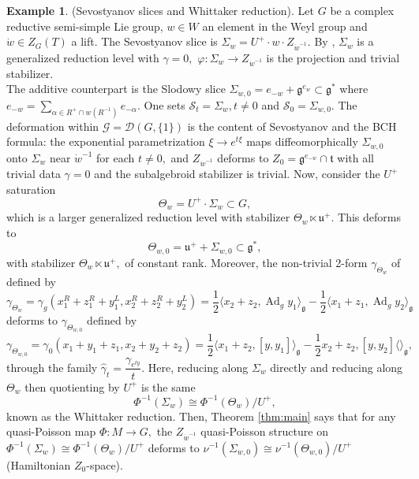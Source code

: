 \documentclass[reqno]{amsart}
\theoremstyle{plain}
\theoremstyle{definition}
\newtheorem{Exp}[Thm]{Example}
\newcommand{\G}{\mathcal{G}}
\newcommand{\g}{\mathfrak{g}}
\newcommand{\too}{\longrightarrow}
\newcommand{\Ad}{\operatorname{Ad}}
\renewcommand{\S}{\mathcal{S}}
\renewcommand{\t}{\mathfrak{t}}
\newcommand{\D}{\mathcal{D}}
\begin{document}
\begin{Exp}(Sevostyanov slices and Whittaker reduction). Let $G$ be a complex reductive semi-simple Lie group, $w\in W$ an element in the Weyl group and $\dot{w} \in Z_{G}(T)$ a lift. The Sevostyanov slice is $\Sigma_{w} = U^{+}\cdot w\cdot Z_{\dot{w}^{-1}}.$ By \cite[]{bualibanu2026reduction}, $\Sigma_w$ is a generalized reduction level with $\gamma = 0,$ $\varphi: \Sigma_w \too Z_{\dot{w}^{-1}}$ is the projection and trivial stabilizer.\\

The additive counterpart is the Slodowy slice $\Sigma_{w,0} = e_{-w} + \g^{e_w} \subset \g^{*}$ where $e_{-w} = \sum_{\alpha \in R^{+}\cap w(R^{-1})} e_{-\alpha}.$ One sets $\S_t = \Sigma_w, t\neq 0$ and $\S_0 = \Sigma_{w,0}.$ The deformation within $\G = \D(G,\{1\})$ is the content of Sevostyanov \cite{sevostyanov2011algebraic} and the BCH formula: the exponential parametrization $\xi \too e^{t\xi}$ maps diffeomorphically $\Sigma_{w,0}$ onto $\Sigma_{w}$ near $\dot{w}^{-1}$ for each $t\neq 0,$ and $Z_{\dot{w}^{-1}}$ deforms to $Z_0 = \g^{e_{-w}} \cap \t$ with all trivial data $\gamma = 0$ and the subalgebroid stabilizer is trivial. Now, consider the $U^{+}$ saturation \[ \Theta_{w} = U^{+}\cdot \Sigma_w \subset G,\] which is a larger generalized reduction level with stabilizer $\Theta_w \ltimes \mathfrak{u}^{+}.$ This deforms to \[
\Theta_{w,0} = \mathfrak{u}^{+} + \Sigma_{w,0} \subset \g^{*},
\]  
with stabilizer $\Theta_w \ltimes \mathfrak{u}^{+},$ of constant rank. Moreover, the non-trivial 2-form $\gamma_{\Theta_w}$ of \cite[Proposition 4.19]{bualibanu2026reduction} defined by \[
\gamma_{\Theta_w} = \gamma_g(x^R_1 + z^R_1 + y^L_1, x^R_2 + z^R_2 + y^L_2) = \dfrac{1}{2} \langle x_2 + z_2, \Ad_{g}y_1 \rangle_{\g} - \dfrac{1}{2} \langle x_1 + z_1, \Ad_{g}y_2 \rangle_{\g} 
\] 
deforms to $\gamma_{\Theta_{w,0}}$ defined by \[
\gamma_{\Theta_{w,0}} = \gamma_0(x_1 + y_1 + z_1, x_2 + y_2 + z_2) = \dfrac{1}{2} \langle x_1 + z_2, [y,y_1] \rangle_{\g} - \dfrac{1}{2} x_2 + z_2, [y,y_2] \langle \rangle_{\g},
\]
through the family $\widehat{\gamma}_t = \dfrac{\gamma_{e^{ty}}}{t}.$
Here, reducing along $\Sigma_w$ directly and reducing along $\Theta_w$ then quotienting by $U^{+}$ is the same \[
\Phi^{-1}(\Sigma_w) \cong \Phi^{-1}(\Theta_w)/U^{+}, 
\]
known as the Whittaker reduction. Then, Theorem \ref{thm:main} says that for any quasi-Poisson map $\Phi: M\too G,$ the $Z_{\dot{w}^{-1}}$ quasi-Poisson structure on $\Phi^{-1}(\Sigma_w) \cong \Phi^{-1}(\Theta_w)/U^{+}$ deforms to $\nu^{-1}(\Sigma_{w,0}) \cong \nu^{-1}(\Theta_{w,0})/U^{+}$ (Hamiltonian $Z_0$-space). 
\end{Exp}
\end{document}
